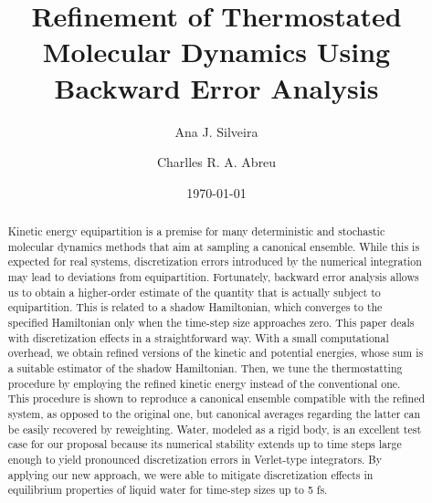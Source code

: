 \documentclass[
	aip,
	jcp,
	reprint,
]{revtex4-1}
\begin{document}
\author{Ana J. Silveira}

\author{Charlles R. A. Abreu}

\title{Refinement of Thermostated Molecular Dynamics Using Backward Error Analysis}


\date{\today}

\begin{abstract}
Kinetic energy equipartition is a premise for many deterministic and stochastic molecular dynamics methods that aim at sampling a canonical ensemble.
While this is expected for real systems, discretization errors introduced by the numerical integration may lead to deviations from equipartition.
Fortunately, backward error analysis allows us to obtain a higher-order estimate of the quantity that is actually subject to equipartition.
This is related to a shadow Hamiltonian, which converges to the specified Hamiltonian only when the time-step size approaches zero.
This paper deals with discretization effects in a straightforward way.
With a small computational overhead, we obtain refined versions of the kinetic and potential energies, whose sum is a suitable estimator of the shadow Hamiltonian.
Then, we tune the thermostatting procedure by employing the refined kinetic energy instead of the conventional one.
This procedure is shown to reproduce a canonical ensemble compatible with the refined system, as opposed to the original one, but canonical averages regarding the latter can be easily recovered by reweighting.
Water, modeled as a rigid body, is an excellent test case for our proposal because its numerical stability extends up to time steps large enough to yield pronounced discretization errors in Verlet-type integrators.
By applying our new approach, we were able to mitigate discretization effects in equilibrium properties of liquid water for time-step sizes up to 5 fs.
\end{abstract}

\maketitle
\end{document}
